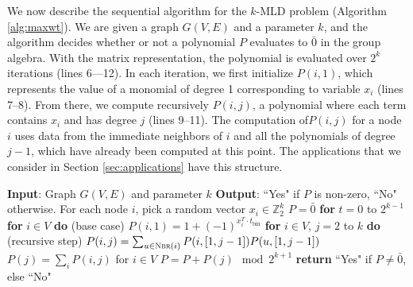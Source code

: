 We now describe the sequential algorithm \maxwt{} for the $k$-MLD problem (Algorithm \ref{alg:maxwt}). We are given a graph $G(V,E)$ and a parameter $k$, and the algorithm decides whether or not a polynomial $P$ evaluates to $\bar 0$ in the group algebra. With the matrix representation, the polynomial is evaluated over $2^k$ iterations (lines 6---12). In each iteration, we first initialize $P(i, 1)$, which represents the value of a monomial of degree 1 corresponding to variable $x_i$ (lines 7--8). From there, we compute recursively $P(i,j)$, a polynomial where each term contains $x_i$ and has degree $j$ (lines 9--11). The computation of$P(i,j)$ for a node $i$ uses data from the immediate neighbors of $i$ and all the polynomials of degree $j-1$, which have already been computed at this point. The applications that we consider in Section \ref{sec:applications} have this structure.

\begin{algorithm}{}
\small
\caption{\small \maxwt{}$(G(V, E), k)$.}
\label{alg:maxwt}
\begin{algorithmic}[1]
\STATE \textbf{Input}: Graph $G(V, E)$ and parameter $k$
\STATE\textbf{Output}: ``Yes" if $P$ is non-zero, ``No" otherwise.
\STATE
\STATE For each node $i$, pick a random vector $x_i \in \mathbb{Z}_{2}^k$
\STATE $P = \bar 0$
\STATE \textbf{for} $t = 0$ to $2^{k-1}$
\STATE \quad \textbf{for} $i \in V$ \textbf{do} (base case)
\STATE \quad \quad $P(i, 1) = 1 + (-1)^{x_i^T \cdot t_{\text{bin}}}$
\STATE \quad \textbf{for} $i \in V$, $j = 2$ to $k$ \textbf{do} (recursive step)
\STATE \quad \quad
$P(i,j) = \sum_{u \in \textsc{Nbr}(i)} P(i, [1, j-1])P(u, [1, j-1])$
\STATE \quad $P(j) = \sum_i P(i,j)$ for $i \in V$
\STATE \quad $P = P + P(j)  \mod 2^{k+1}$
\STATE \textbf{return} ``Yes" if $P \neq \bar 0$, else ``No"
\end{algorithmic}
\end{algorithm}